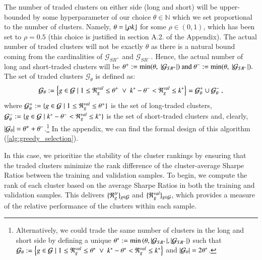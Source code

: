 \mx
The number of traded clusters on either side (long and short) will be upper-bounded by some hyperparameter of our choice $\theta \in \mathbb{N}$
which we set proportional to the number of clusters. Namely, $\theta =\lfloor \rho k \rfloor$ for some $\rho\in(0,1)$, which has been set to $\rho=0.5$ (this choice is justified in section A.2. of the Appendix).
%
The actual number of traded clusters will not be exactly $\theta$ as there is a natural bound coming from the cardinalities of $\mathcal G_{SR^+}$ and $\mathcal G_{SR^-}$. Hence, the actual number of long and short-traded clusters will be
$
\theta^+ := \min(\theta, ~|\mathcal G_{SR^+}|)
~\text{and}~
\theta^- := \min(\theta, ~|\mathcal G_{SR^-}|)
.
$
The set of traded clusters $\mathcal G_{\theta}$ is defined as:
$$
\mathcal{G}_\theta := 
\left\{
g \in \mathcal G 
\mid 
1\leq \mathfrak{R}_g^{val} \leq \theta^+
~\vee~ 
k^* -\theta^- < \mathfrak{R}_g^{val} \leq k^*
\right\} 
= 
\mathcal{G}_{\theta}^+ \cup \mathcal{G}_{\theta}^-
~,
$$
where
$
\mathcal{G}_{\theta}^+ := 
\{ g \in\mathcal{G} \mid 
1\leq \mathfrak{R}_g^{val} \leq \theta^+
\}
$
is the set of long-traded clusters,
$
\mathcal{G}_{\theta}^- := 
\{ g \in\mathcal{G} \mid 
k^*-\theta^-
< \mathfrak{R}_g^{val} \leq 
k^*
\}
$
is the set of short-traded clusters 
and, clearly, $\left|\mathcal{G}_{\theta}\right|=\theta^+ + \theta^- $.\footnote{
Alternatively, we could trade the same number of clusters in the long and short side by defining a unique 
$
\theta^* := \min\left(\theta, |\mathcal G_{SR^+}|, |\mathcal G_{SR^-}| \right)
$
such that
$
\mathcal{G}_\theta := 
\left\{
g \in \mathcal G 
\mid 
1\leq \mathfrak{R}_g^{val} \leq \theta^*
~\vee~ 
k^*-\theta^* < \mathfrak{R}_g^{val} \leq k^*
\right\} 
$
and 
$\left|\mathcal{G}_\theta\right|=2\theta^*$.
}
In the appendix, we can find the formal design of this algorithm (\cref{alg:greedy_selection}).


In this case, we prioritize the stability of the cluster rankings by ensuring that the traded clusters minimize the rank difference of the cluster-average Sharpe Ratios between the training and validation samples. 
To begin, we compute the rank of each cluster based on the average Sharpe Ratios in both the training and validation samples. This delivers $\{\mathfrak{R}_g^{tr}\}_{g\in\mathcal{G}}$ and $\{\mathfrak{R}_g^{val}\}_{g\in\mathcal{G}}$, which provides a measure of the relative performance of the clusters within each sample.


